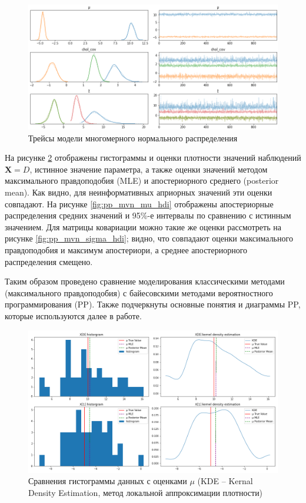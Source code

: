 \documentclass[a4paper,14pt]{extreport}
\begin{document}
\begin{figure}[H]
	\includegraphics[width=\linewidth]{img/gen/pp_mvn_trace.png}
	\caption{Трейсы модели многомерного нормального распределения}
	\label{fig:pp_mvn_trace}
\end{figure}

На рисунке \ref{fig:pp_mvn_mu_comparison} отображены гистограммы и оценки плотности значений наблюдений $\mathbf{X} = D$, истинное значение параметра, а также оценки значений методом максимального правдоподобия (MLE) и апостериорного среднего (posterior mean). Как видно, для неинформативных априорных значений эти оценки совпадают. На рисунке \ref{fig:pp_mvn_mu_hdi} отображены апостериорные распределения средних значений и 95\%-е интервалы по сравнению с истинным значением. Для матрицы ковариации можно такие же оценки рассмотреть на рисунке \ref{fig:pp_mvn_sigma_hdi}; видно, что совпадают оценки максимального правдоподобия и максимум апостериори, а среднее апостериорного распределения смещено.

Таким образом проведено сравнение моделирования классическими методами (максимального правдоподобия) с байесовскими методами вероятностного программирования (PP). Также подчеркнуты основные понятия и диаграммы PP, которые используются далее в работе.

\begin{figure}[H]
	\includegraphics[width=\linewidth]{img/gen/pp_mvn_mu_comparison.png}
	\caption{Сравнения гистограммы данных с оценками $\mu$ (KDE -- Kernal Density Estimation, метод локальной аппроксимации плотности)}
	\label{fig:pp_mvn_mu_comparison}
\end{figure}
\end{document}
